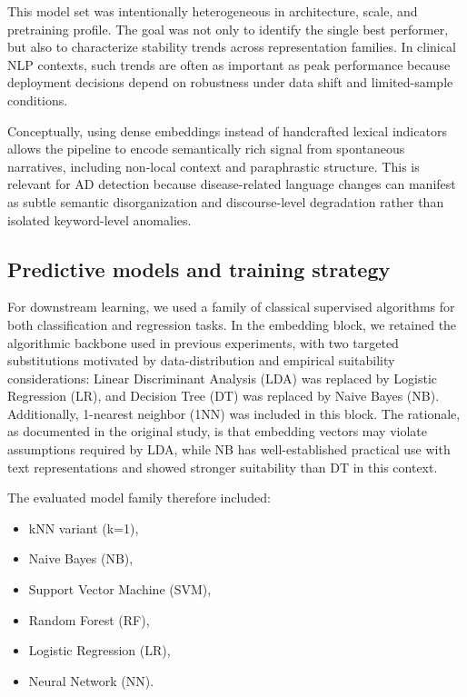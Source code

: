 \documentclass[final,5p,times]{elsarticle}
\begin{document}
This model set was intentionally heterogeneous in architecture, scale, and pretraining profile. The goal was not only to identify the single best performer, but also to characterize stability trends across representation families. In clinical NLP contexts, such trends are often as important as peak performance because deployment decisions depend on robustness under data shift and limited-sample conditions.

Conceptually, using dense embeddings instead of handcrafted lexical indicators allows the pipeline to encode semantically rich signal from spontaneous narratives, including non-local context and paraphrastic structure. This is relevant for AD detection because disease-related language changes can manifest as subtle semantic disorganization and discourse-level degradation rather than isolated keyword-level anomalies.

\subsection{Predictive models and training strategy}

For downstream learning, we used a family of classical supervised algorithms for both classification and regression tasks. In the embedding block, we retained the algorithmic backbone used in previous experiments, with two targeted substitutions motivated by data-distribution and empirical suitability considerations: Linear Discriminant Analysis (LDA) was replaced by Logistic Regression (LR), and Decision Tree (DT) was replaced by Naive Bayes (NB). Additionally, 1-nearest neighbor (1NN) was included in this block. The rationale, as documented in the original study, is that embedding vectors may violate assumptions required by LDA, while NB has well-established practical use with text representations and showed stronger suitability than DT in this context.

The evaluated model family therefore included:

\begin{itemize}
    \item kNN variant (k=1),
    \item Naive Bayes (NB),
    \item Support Vector Machine (SVM),
    \item Random Forest (RF),
    \item Logistic Regression (LR),
    \item Neural Network (NN).
\end{itemize}
\end{document}
